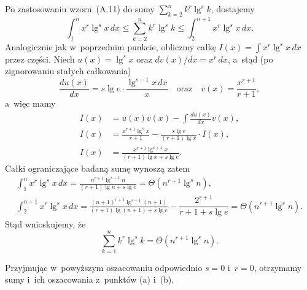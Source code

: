 \subproblem %
Po zastosowaniu wzoru~(A.11) do sumy $\sum_{k=2}^nk^r\lg^sk$, dostajemy
\[
	\int_1^nx^r\lg^sx\,dx \le \sum_{k=2}^nk^r\lg^sk \le \int_2^{n+1}x^r\lg^sx\,dx.
\]
Analogicznie jak w~poprzednim punkcie, obliczmy całkę $I(x) = \int x^r\lg^sx\,dx$ przez części. Niech $u(x)=\lg^sx$ oraz $dv(x)/dx=x^r\,dx$, a~stąd (po zignorowaniu stałych całkowania)
\[
	\frac{du(x)}{dx} = s\lg e\cdot\frac{\lg^{s-1}x\,dx}{x} \quad\text{oraz}\quad v(x) = \frac{x^{r+1}}{r+1},
\]
a~więc mamy
\begin{align*}
	I(x) &= u(x)v(x)-\int\frac{du(x)}{dx}v(x), \\
	I(x) &= \frac{x^{r+1}\lg^sx}{r+1}-\frac{s\lg e}{(r+1)\lg x}\cdot I(x), \\
	I(x) &= \frac{x^{r+1}\lg^{s+1}x}{(r+1)\lg x+s\lg e}.
\end{align*}
Całki ograniczające badaną sumę wynoszą zatem
\begin{gather*}
	{\int_1^nx^r\lg^sx\,dx} = \frac{n^{r+1}\lg^{s+1}n}{(r+1)\lg n+s\lg e} = \Theta(n^{r+1}\lg^sn), \\[2mm]
	{\int_2^{n+1}x^r\lg^sx\,dx} = \frac{(n+1)^{r+1}\lg^{s+1}(n+1)}{(r+1)\lg(n+1)+s\lg e}-\dfrac{2^{r+1}}{r+1+s\lg e} = \Theta(n^{r+1}\lg^sn).
\end{gather*}
Stąd wnioskujemy, że
\[
	\sum_{k=1}^nk^r\lg^sk = \Theta(n^{r+1}\lg^sn).
\]

Przyjmując w~powyższym oszacowaniu odpowiednio $s=0$ i~$r=0$, otrzymamy sumy i~ich oszacowania z~punktów (a) i~(b).

\endinput
